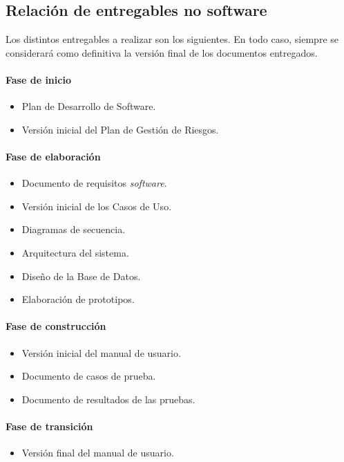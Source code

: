 \documentclass[twoside]{report}
\begin{document}
\subsection{Relación de entregables no software}

Los distintos entregables a realizar son los siguientes. En todo caso, siempre se considerará como definitiva la versión final de los documentos entregados.
\paragraph{Fase de inicio\\}
\begin{itemize}
\item Plan de Desarrollo de Software.
\item Versión inicial del Plan de Gestión de Riesgos.
\end{itemize}
\paragraph{Fase de elaboración\\}
\begin{itemize}
\item Documento de requisitos \textit{software}.
\item Versión inicial de los Casos de Uso.
\item Diagramas de secuencia.
\item Arquitectura del sistema.
\item Diseño de la Base de Datos.
\item Elaboración de prototipos.
\end{itemize}

\paragraph{Fase de construcción\\}
\begin{itemize}
\item Versión inicial del manual de usuario.
\item Documento de casos de prueba.
\item Documento de resultados de las pruebas.
\end{itemize}

\paragraph{Fase de transición\\}
\begin{itemize}
\item Versión final del manual de usuario.
\end{itemize}
\end{document}
